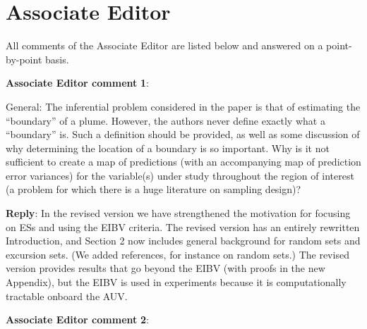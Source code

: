 \documentclass[a4paper]{article}
\newcounter{reviewer}
\def\aecom{\textbf{Associate Editor comment }}
\def\reply{\textbf{Reply}}
\begin{document}
 \section*{Associate Editor}
All comments of the Associate Editor are listed below and answered on a point-by-point basis.

\setcounter{reviewer}{1}





\vspace{5mm}
\noindent \aecom \textbf{1}:

General: The inferential problem considered in the paper is that of estimating the “boundary” of a plume. However, the authors never define exactly what a “boundary” is. Such a definition should be provided, as well as some discussion of why determining the location of a boundary is so important. Why is it not sufficient to create a map of predictions (with an accompanying map of prediction error variances) for the variable(s) under study throughout the region of interest (a problem for which there is a huge literature on sampling design)?\par

\reply: In the revised version we have strengthened the motivation for focusing on ESs and using the EIBV criteria. The revised version has an entirely rewritten Introduction, and Section 2 now includes general background for random sets and excursion sets. (We added references, for instance \cite{Molchanov2005} on random sets.) The revised version provides results that go beyond the EIBV (with proofs in the new Appendix), but the EIBV is used in experiments because it is computationally tractable onboard the AUV.

\vspace{1em}

\vspace{5mm}
\noindent \aecom \textbf{2}:
\end{document}
